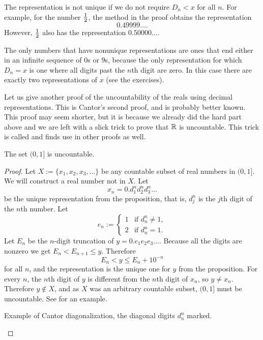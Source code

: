 The representation is not unique if we do not require
$D_n < x$ for all $n$.
For example, for the
number $\nicefrac{1}{2}$, the method in the proof obtains the representation
\begin{equation*}
0.49999\ldots .
\end{equation*}
However, $\nicefrac{1}{2}$ also has the representation $0.50000\ldots$.

The only numbers that have nonunique
representations are ones that end either in an infinite sequence of $0$s
or $9$s, because the only representation for which
$D_n = x$ is one where all digits past the $n$th digit are zero.  In this case
there are exactly two representations of $x$ (see the exercises).

Let us give another proof of the uncountability of the reals using decimal
representations.
This is Cantor's second proof, and is probably better known.
This proof may seem shorter, but it is because we already did
the hard part above and we are left with a slick trick to prove that $\R$ is
uncountable.  This trick is called
\emph{} and
finds use in other proofs as well.

\begin{thm}[Cantor]
The set $(0,1]$ is uncountable.
\end{thm}

\begin{proof}
Let $X := \{ x_1,x_2,x_3,\ldots \}$ be any countable subset of real numbers in $(0,1]$.
We will construct a real number not in $X$.  Let
\begin{equation*}
x_n = 0.d_1^nd_2^nd_3^n\ldots
\end{equation*}
be the unique representation from the proposition, that is, $d_j^n$ is the
$j$th digit of the $n$th number.  Let
\begin{equation*}
e_n :=
\begin{cases}
1 & \text{if } d_n^n \not= 1, \\
2 & \text{if } d_n^n = 1.
\end{cases}
\end{equation*}
Let $E_n$ be the $n$-digit truncation of $y = 0.e_1e_2e_3\ldots$.  Because
all the digits are nonzero we get $E_n < E_{n+1} \leq y$.  Therefore
\begin{equation*}
E_n < y \leq E_n + {10}^{-n} 
\end{equation*}
for all $n$, and the representation is the unique one for $y$ from 
the proposition.  For every $n$, the $n$th digit
of $y$ is different from the $n$th digit of $x_n$, so $y \not= x_n$.
Therefore $y \notin X$, and as $X$ was an arbitrary countable subset,
$(0,1]$ must be uncountable.  See  for an
example.
\begin{myfigureht}

\caption{Example of Cantor diagonalization, the diagonal digits $d_n^n$
marked.\label{cantorexamplefig}}
\end{myfigureht}
\end{proof}

